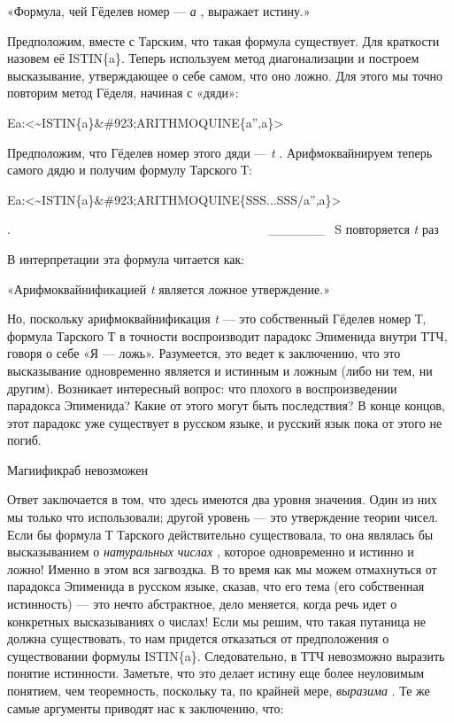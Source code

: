 \documentclass[../main.tex]{subfiles}
\begin{document}
«Формула, чей Гёделев номер --- \emph{а} , выражает истину.»

Предположим, вместе с Тарским, что такая формула существует. Для краткости назовем её ISTIN\{a\}. Теперь используем метод диагонализации и построем высказывание, утверждающее о себе самом, что оно ложно. Для этого мы точно повторим метод Гёделя, начиная с «дяди»:

Ea:\textless\textasciitilde ISTIN\{a\}\&\#923;ARITHMOQUINE\{a'',a\}\textgreater{}

Предположим, что Гёделев номер этого дяди --- \emph{t} . Арифмоквайнируем теперь самого дядю и получим формулу Тарского Т:

Ea:\textless\textasciitilde ISTIN\{a\}\&\#923;ARITHMOQUINE\{SSS...SSS/a'',a\}\textgreater{}

.~~~~~~~~~~~~~~~~~~~~~~~~~~~~~~~~~~~~~~~~~ \textbar\_\_\_\_\_\_\textbar~ S повторяется \emph{t} раз

В интерпретации эта формула читается как:

«Арифмоквайнификацией \emph{t} является ложное утверждение.»

Но, поскольку арифмоквайнификация \emph{t} --- это собственный Гёделев номер Т, формула Тарского Т в точности воспроизводит парадокс Эпименида внутри ТТЧ, говоря о себе «Я --- ложь». Разумеется, это ведет к заключению, что это высказывание одновременно является и истинным и ложным (либо ни тем, ни другим). Возникает интересный вопрос: что плохого в воспроизведении парадокса Эпименида? Какие от этого могут быть последствия? В конце концов, этот парадокс уже существует в русском языке, и русский язык пока от этого не погиб.

Магиификраб невозможен

Ответ заключается в том, что здесь имеются два уровня значения. Один из них мы только что использовали; другой уровень --- это утверждение теории чисел. Если бы формула Т Тарского действительно существовала, то она являлась бы высказыванием о \emph{натуральных числах} , которое одновременно и истинно и ложно! Именно в этом вся загвоздка. В то время как мы можем отмахнуться от парадокса Эпименида в русском языке, сказав, что его тема (его собственная истинность) --- это нечто абстрактное, дело меняется, когда речь идет о конкретных высказываниях о числах! Если мы решим, что такая путаница не должна существовать, то нам придется отказаться от предположения о существовании формулы ISTIN\{a\}. Следовательно, в ТТЧ невозможно выразить понятие истинности. Заметьте, что это делает истину еще более неуловимым понятием, чем теоремность, поскольку та, по крайней мере, \emph{выразима} . Те же самые аргументы приводят нас к заключению, что:
\end{document}
